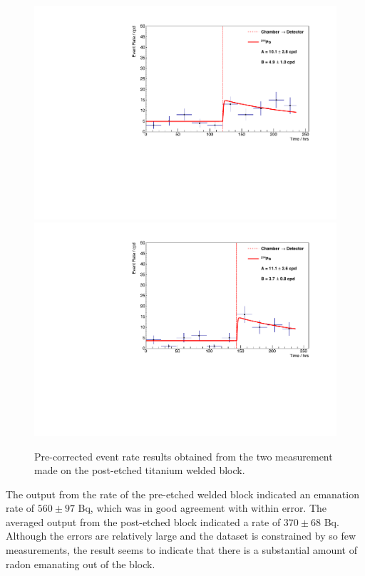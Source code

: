 \begin{figure}[h!]
    \centering
    \includegraphics[scale=0.42]{Chapter_4/Figures/ucl_measurements/titanium_welding_block_post_etching_1_Po214.pdf}
    \includegraphics[scale=0.42]{Chapter_4/Figures/ucl_measurements/titanium_welding_block_post_etching_2_Po214.pdf}
    \caption[Pre-corrected \PoTOF{} event rate results obtained from the two measurements made on the post-etched titanium welded block.]
    {Pre-corrected \PoTOF{} event rate results obtained from the two measurement made on the post-etched titanium welded block.}
    \label{fig:ti_post_etched_welded_block_results}
\end{figure}
%

The output from the \PoTOF{} rate of the pre-etched welded block indicated an emanation rate of $560\pm97$ \micro{}Bq, which was in good agreement with \PoTOE{} within error. The averaged output from the post-etched block indicated a rate of $370\pm68$ \micro{}Bq. Although the errors are relatively large and the dataset is constrained by so few measurements, the result seems to indicate that there is a substantial amount of radon emanating out of the block. 


